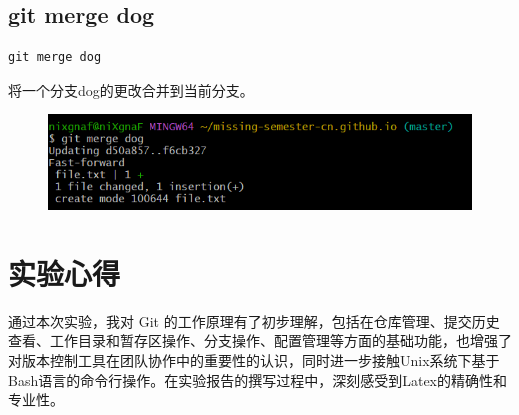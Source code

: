 \documentclass{article}
\begin{document}
\newpage
\subsection{git merge dog}
\lstset{language=bash}
\begin{lstlisting}
git merge dog
\end{lstlisting}

\noindent 将一个分支dog的更改合并到当前分支。
\begin{figure}[h]
    \centering
    \includegraphics[width=1\linewidth]{picture/gitmerge.png}
\end{figure}

\section{实验心得}
通过本次实验，我对 Git 的工作原理有了初步理解，包括在仓库管理、提交历史查看、工作目录和暂存区操作、分支操作、配置管理等方面的基础功能，也增强了对版本控制工具在团队协作中的重要性的认识，同时进一步接触Unix系统下基于Bash语言的命令行操作。在实验报告的撰写过程中，深刻感受到Latex的精确性和专业性。
\end{document}
